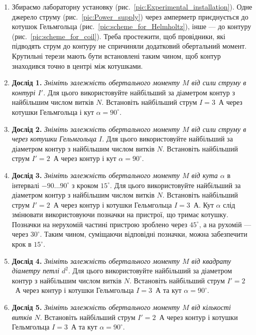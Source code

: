 \begin{enumerate}
	\item Збираємо лабораторну установку (рис.~\ref{pic:Experimental_installation}). Одне джерело струму (рис.~\ref{pic:Power_supply}) через амперметр приєднується до котушок Гельмгольца (рис.~\ref{pic:scheme_for_Helmholtz}), інше --- до контуру (рис.~\ref{pic:scheme_for_coil}). Треба простежити, щоб провідники, які підводять струм до контуру не спричиняли додатковий обертальний момент. Крутильні терези мають бути встановлені таким чином, щоб контур знаходився точно в центрі між котушками.
	\item \textbf{Дослід 1.} \emph{Зніміть залежність обертального моменту $M$ від сили струму в контурі $I'$.} Для цього використовуйте найбільший за діаметром контур з найбільшим числом витків $N$. Встановіть найбільший струм $I = 3$~А через котушки Гельмгольца і кут $\alpha = 90^\circ$.
	\item \textbf{Дослід 2.}  \emph{Зніміть залежність обертального моменту $M$ від сили струму в через котушки Гельмгольца $I$.} Для цього використовуйте найбільший за діаметром контур з найбільшим числом витків $N$. Встановіть найбільший струм $I' = 2$~А через контур і кут $\alpha = 90^\circ$.
	\item \textbf{Дослід 3.} \emph{Зніміть залежність обертального моменту $M$ від кута $\alpha$} в інтервалі $-90\ldots 90^\circ$ з кроком $15^\circ$.  Для цього використовуйте найбільший за діаметром контур з найбільшим числом витків $N$. Встановіть найбільший струм $I' = 2$~А через контур і котушки Гельмгольца $I = 3$~А. Кут $\alpha$ слід змінювати використовуючи позначки на пристрої, що тримає котушку. Позначки на нерухомій частині пристрою зроблено через $45^\circ$, а на рухомій --- через $30^\circ$. Таким чином, суміщаючи відповідні позначки, можна забезпечити крок в  $15^\circ$.
	\item \textbf{Дослід 4.} \emph{Зніміть залежність обертального моменту $M$ від квадрату діаметру петлі $d^2$}. Для цього використовуйте найбільший за діаметром контур з найбільшим числом витків $N$. Встановіть найбільший струм $I' = 2$~А через контур і котушки Гельмгольца $I = 3$~А та кут $\alpha = 90^\circ$.
	\item \textbf{Дослід 5.} \emph{Зніміть залежність обертального моменту $M$ від кількості витків $N$}.  Встановіть найбільший струм $I' = 2$~А через контур і котушки Гельмгольца $I = 3$~А та кут $\alpha = 90^\circ$.
\end{enumerate}

